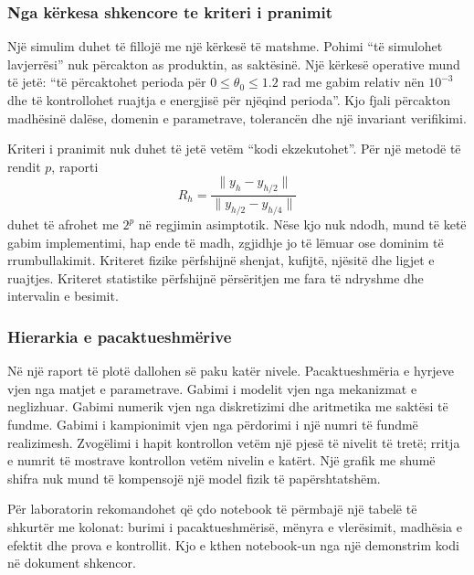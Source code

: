 \documentclass[11pt,oneside,openany]{book}
\begin{document}
\subsubsection{Nga kërkesa shkencore te kriteri i pranimit}
Një simulim duhet të fillojë me një kërkesë të matshme. Pohimi ``të simulohet lavjerrësi'' nuk përcakton as produktin, as saktësinë. Një kërkesë operative mund të jetë: ``të përcaktohet perioda për $0\le\theta_0\le1.2$ rad me gabim relativ nën $10^{-3}$ dhe të kontrollohet ruajtja e energjisë për njëqind perioda''. Kjo fjali përcakton madhësinë dalëse, domenin e parametrave, tolerancën dhe një invariant verifikimi.

Kriteri i pranimit nuk duhet të jetë vetëm ``kodi ekzekutohet''. Për një metodë të rendit $p$, raporti
\begin{equation}
 R_h=\frac{\|y_h-y_{h/2}\|}{\|y_{h/2}-y_{h/4}\|}
\end{equation}
duhet të afrohet me $2^p$ në regjimin asimptotik. Nëse kjo nuk ndodh, mund të ketë gabim implementimi, hap ende të madh, zgjidhje jo të lëmuar ose dominim të rrumbullakimit. Kriteret fizike përfshijnë shenjat, kufijtë, njësitë dhe ligjet e ruajtjes. Kriteret statistike përfshijnë përsëritjen me fara të ndryshme dhe intervalin e besimit.

\subsubsection{Hierarkia e pacaktueshmërive}
Në një raport të plotë dallohen së paku katër nivele. Pacaktueshmëria e hyrjeve vjen nga matjet e parametrave. Gabimi i modelit vjen nga mekanizmat e neglizhuar. Gabimi numerik vjen nga diskretizimi dhe aritmetika me saktësi të fundme. Gabimi i kampionimit vjen nga përdorimi i një numri të fundmë realizimesh. Zvogëlimi i hapit kontrollon vetëm një pjesë të nivelit të tretë; rritja e numrit të mostrave kontrollon vetëm nivelin e katërt. Një grafik me shumë shifra nuk mund të kompensojë një model fizik të papërshtatshëm.

Për laboratorin rekomandohet që çdo notebook të përmbajë një tabelë të shkurtër me kolonat: burimi i pacaktueshmërisë, mënyra e vlerësimit, madhësia e efektit dhe prova e kontrollit. Kjo e kthen notebook-un nga një demonstrim kodi në dokument shkencor.



\end{document}
